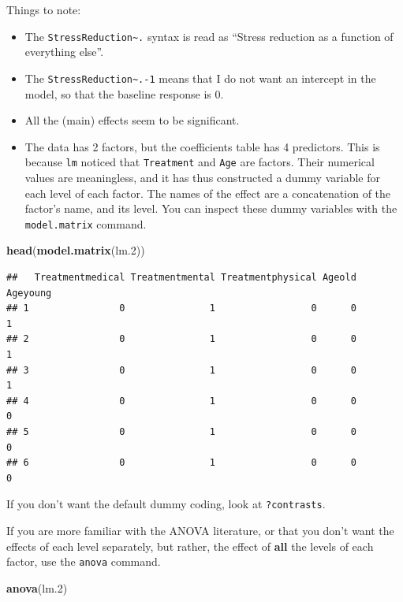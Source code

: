 \documentclass[]{book}
\newenvironment{Shaded}{\begin{snugshade}}{\end{snugshade}}
\newcommand{\KeywordTok}[1]{\textcolor[rgb]{0.13,0.29,0.53}{\textbf{{#1}}}}
\newcommand{\FloatTok}[1]{\textcolor[rgb]{0.00,0.00,0.81}{{#1}}}
\newcommand{\NormalTok}[1]{{#1}}
\theoremstyle{definition}
\theoremstyle{definition}
\theoremstyle{remark}
\begin{document}
Things to note:

\begin{itemize}
\item
  The \texttt{StressReduction\textasciitilde{}.} syntax is read as
  ``Stress reduction as a function of everything else''.
\item
  The \texttt{StressReduction\textasciitilde{}.-1} means that I do not
  want an intercept in the model, so that the baseline response is 0.
\item
  All the (main) effects seem to be significant.
\item
  The data has 2 factors, but the coefficients table has 4 predictors.
  This is because \texttt{lm} noticed that \texttt{Treatment} and
  \texttt{Age} are factors. Their numerical values are meaningless, and
  it has thus constructed a dummy variable for each level of each
  factor. The names of the effect are a concatenation of the factor's
  name, and its level. You can inspect these dummy variables with the
  \texttt{model.matrix} command.
\end{itemize}

\begin{Shaded}
\begin{Highlighting}[]
\KeywordTok{head}\NormalTok{(}\KeywordTok{model.matrix}\NormalTok{(lm}\FloatTok{.2}\NormalTok{))}
\end{Highlighting}
\end{Shaded}

\begin{verbatim}
##   Treatmentmedical Treatmentmental Treatmentphysical Ageold Ageyoung
## 1                0               1                 0      0        1
## 2                0               1                 0      0        1
## 3                0               1                 0      0        1
## 4                0               1                 0      0        0
## 5                0               1                 0      0        0
## 6                0               1                 0      0        0
\end{verbatim}

If you don't want the default dummy coding, look at \texttt{?contrasts}.

If you are more familiar with the ANOVA literature, or that you don't
want the effects of each level separately, but rather, the effect of
\textbf{all} the levels of each factor, use the \texttt{anova} command.

\begin{Shaded}
\begin{Highlighting}[]
\KeywordTok{anova}\NormalTok{(lm}\FloatTok{.2}\NormalTok{)}
\end{Highlighting}
\end{Shaded}
\end{document}
